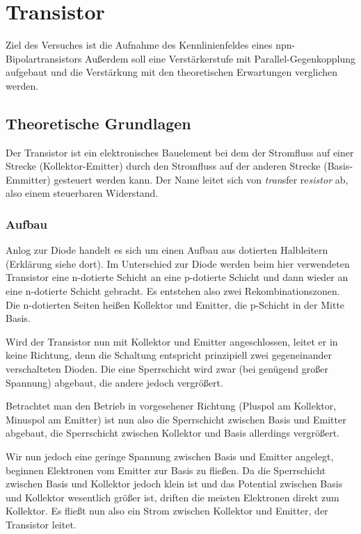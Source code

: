 \section{Transistor}
Ziel des Versuches ist die Aufnahme des Kennlinienfeldes eines
npn-Bipolartransistors  Außerdem soll eine Verstärkerstufe mit
Parallel-Gegenkopplung aufgebaut und die Verstärkung mit den theoretischen
Erwartungen verglichen werden.

\subsection{Theoretische Grundlagen}

Der Transistor ist ein elektronisches Bauelement bei dem der Stromfluss auf
einer Strecke (Kollektor-Emitter) durch den Stromfluss auf der anderen Strecke
(Basis-Emmitter) gesteuert werden kann. Der Name leitet sich von
\textit{tran}sfer re\textit{sistor} ab, also einem steuerbaren Widerstand.

\subsubsection{Aufbau}

Anlog zur Diode handelt es sich um einen Aufbau aus dotierten Halbleitern
(Erklärung siehe dort). Im Unterschied zur Diode werden beim hier verwendeten
Transistor eine n-dotierte Schicht an eine p-dotierte Schicht und dann wieder
an eine n-dotierte Schicht gebracht. Es entstehen also zwei
Rekombinationszonen. Die n-dotierten Seiten heißen Kollektor und Emitter, die
p-Schicht in der Mitte Basis.

Wird der Transistor nun mit Kollektor und Emitter angeschlossen, leitet er in
keine Richtung, denn die Schaltung entspricht prinzipiell zwei gegeneinander
verschalteten Dioden. Die eine Sperrschicht wird zwar (bei genügend großer
Spannung) abgebaut, die andere jedoch vergrößert.

Betrachtet man den Betrieb in vorgesehener Richtung (Pluspol am Kollektor,
Minuspol am Emitter) ist nun also die Sperrschicht zwischen Basis und Emitter
abgebaut, die Sperrschicht zwischen Kollektor und Basis allerdings vergrößert.

Wir nun jedoch eine geringe Spannung zwischen Basis und Emitter angelegt,
beginnen Elektronen vom Emitter zur Basis zu fließen. Da die Sperrschicht
zwischen Basis und Kollektor jedoch klein ist und das Potential zwischen Basis
und Kollektor wesentlich größer ist, driften die meisten Elektronen direkt zum
Kollektor. Es fließt nun also ein Strom zwischen Kollektor und Emitter, der
Transistor leitet.

